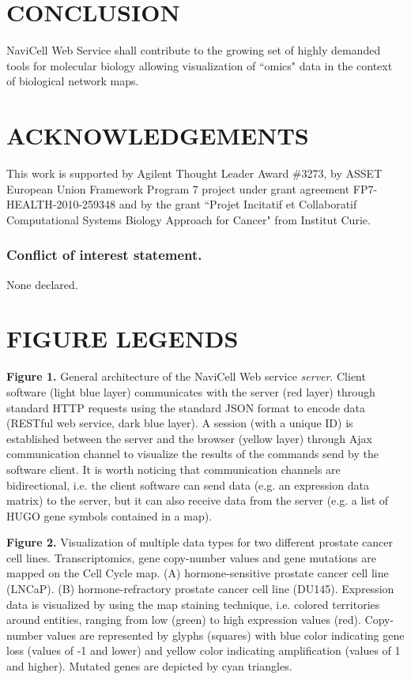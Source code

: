 \documentclass[a4,center,fleqn]{NAR}
\begin{document}
\section{CONCLUSION}

NaviCell Web Service shall contribute to the growing set of highly demanded
tools for molecular biology allowing visualization of ``omics" data in the
context of biological network maps.

\section{ACKNOWLEDGEMENTS}

This work is supported by Agilent Thought Leader Award \#3273, by ASSET European Union Framework Program 7 project under grant agreement FP7-HEALTH-2010-259348 and by the
grant ``Projet Incitatif et Collaboratif Computational Systems Biology Approach for Cancer" from Institut Curie.

\subsubsection{Conflict of interest statement.} None declared.

\section{FIGURE LEGENDS}

\textbf{Figure 1.} General architecture of the NaviCell Web service
\emph{server}. Client software (light blue layer) communicates with the server
(red layer) through standard HTTP requests using the standard JSON format to
encode data (RESTful web service, dark blue layer). A session (with a unique ID)
is established between the server and the browser (yellow layer) through
Ajax communication channel to visualize the results of the commands send by the
software client. It is worth noticing that communication channels are bidirectional, i.e.
the client software can send data (e.g. an expression data matrix) to the
server, but it can also receive data from the server (e.g. a list of HUGO
gene symbols contained in a map).

\textbf{Figure 2.} Visualization of multiple data types for two different
prostate cancer cell lines. Transcriptomics, gene copy-number values and gene
mutations \cite{barretina2012cancer} are mapped on the Cell Cycle map. (A)
hormone-sensitive prostate cancer cell line (LNCaP). (B) hormone-refractory
prostate cancer cell line (DU145). Expression data is visualized by using the
map staining technique, i.e. colored territories around entities, ranging from
low  (green) to high expression values (red).  Copy-number values are
represented by glyphs (squares) with blue color indicating gene loss (values of
-1 and lower) and yellow color indicating amplification (values of 1 and
higher). Mutated genes are depicted by cyan triangles.
\end{document}
